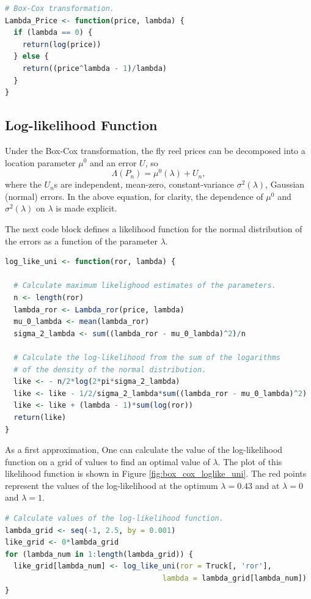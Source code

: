 \documentclass[11pt]{book}
\begin{document}
\vspace{1.0in}

\begin{lstlisting}[language=R]
# Box-Cox transformation.
Lambda_Price <- function(price, lambda) {
  if (lambda == 0) {
    return(log(price))
  } else {
    return((price^lambda - 1)/lambda)
  }
}
\end{lstlisting}

\pagebreak
\subsection{Log-likelihood Function}

Under the Box-Cox transformation,
the fly reel prices can be decomposed into a location parameter $\mu^0$ 
and an error $U$, so
$$\Lambda(P_n) = \mu^0(\lambda) + U_n,$$
where the $U_n$s are independent, mean-zero, constant-variance 
$\sigma^2(\lambda)$, Gaussian (normal) errors. 
In the above equation, for clarity, the dependence of $\mu^0$ and 
$\sigma^2(\lambda)$ on $\lambda$ is made explicit.


The next code block defines a likelihood function for the normal distribution of the errors
as a function of the parameter $\lambda$.

\begin{lstlisting}[language=R]
log_like_uni <- function(ror, lambda) {

  # Calculate maximum likelighood estimates of the parameters.
  n <- length(ror)
  lambda_ror <- Lambda_ror(price, lambda)
  mu_0_lambda <- mean(lambda_ror)
  sigma_2_lambda <- sum((lambda_ror - mu_0_lambda)^2)/n

  # Calculate the log-likelihood from the sum of the logarithms
  # of the density of the normal distribution.
  like <- - n/2*log(2*pi*sigma_2_lambda)
  like <- like - 1/2/sigma_2_lambda*sum((lambda_ror - mu_0_lambda)^2)
  like <- like + (lambda - 1)*sum(log(ror))
  return(like)
}
\end{lstlisting}

\pagebreak
As a first approximation, 
One can calculate the value of the log-likelihood function on a grid of values
to find an optimal value of $\lambda$.
The plot of this likelihood function is shown in Figure \ref{fig:box_cox_loglike_uni}.
The red points represent the values of the log-likelihood 
at the optimum $\lambda = 0.43$ and at $\lambda = 0$ and $\lambda = 1$.

\begin{lstlisting}[language=R]
# Calculate values of the log-likelihood function.
lambda_grid <- seq(-1, 2.5, by = 0.001)
like_grid <- 0*lambda_grid
for (lambda_num in 1:length(lambda_grid)) {
  like_grid[lambda_num] <- log_like_uni(ror = Truck[, 'ror'],
                                    lambda = lambda_grid[lambda_num])
}
\end{lstlisting}
\end{document}
